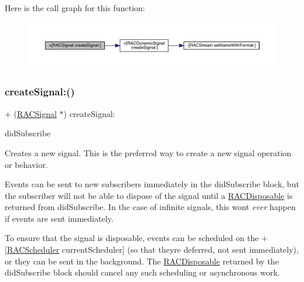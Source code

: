 Here is the call graph for this function\+:\nopagebreak
\begin{figure}[H]
\begin{center}
\leavevmode
\includegraphics[width=350pt]{interface_r_a_c_signal_a4ba374f148d6e2a0339c4f4202b4dc26_cgraph}
\end{center}
\end{figure}
\mbox{\label{interface_r_a_c_signal_a4ba374f148d6e2a0339c4f4202b4dc26}} 
\subsubsection{\texorpdfstring{create\+Signal\+:()}{createSignal:()}\hspace{0.1cm}{\footnotesize\ttfamily [3/3]}}
{\footnotesize\ttfamily + (\mbox{\hyperlink{interface_r_a_c_signal}{R\+A\+C\+Signal}} $\ast$) create\+Signal\+: \begin{DoxyParamCaption}\item[{(\mbox{\hyperlink{interface_r_a_c_disposable}{R\+A\+C\+Disposable}} $\ast$($^\wedge$)(id$<$ \mbox{\hyperlink{interface_r_a_c_subscriber}{R\+A\+C\+Subscriber}} $>$ subscriber))}]{did\+Subscribe }\end{DoxyParamCaption}}

Creates a new signal. This is the preferred way to create a new signal operation or behavior.

Events can be sent to new subscribers immediately in the {\ttfamily did\+Subscribe} block, but the subscriber will not be able to dispose of the signal until a \mbox{\hyperlink{interface_r_a_c_disposable}{R\+A\+C\+Disposable}} is returned from {\ttfamily did\+Subscribe}. In the case of infinite signals, this won\textquotesingle{}t {\itshape ever} happen if events are sent immediately.

To ensure that the signal is disposable, events can be scheduled on the +\mbox{[}\mbox{\hyperlink{interface_r_a_c_scheduler}{R\+A\+C\+Scheduler}} current\+Scheduler\mbox{]} (so that they\textquotesingle{}re deferred, not sent immediately), or they can be sent in the background. The \mbox{\hyperlink{interface_r_a_c_disposable}{R\+A\+C\+Disposable}} returned by the {\ttfamily did\+Subscribe} block should cancel any such scheduling or asynchronous work.

